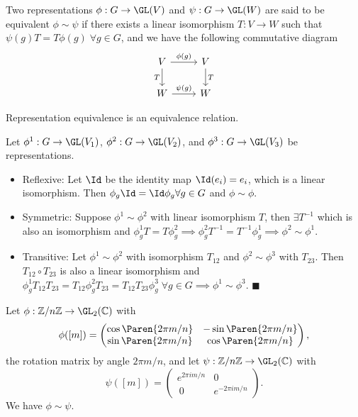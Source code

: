 \documentclass[../Project.tex]{subfiles}
\begin{document}
\begin{defi}
	Two representations $\phi : G \to \GL(V)$ and $\psi : G \to \GL(W)$ are said to be equivalent $\phi \sim \psi$ if there exists a linear isomorphism $T : V \to W$ such that $\psi(g)T =T\phi(g)\;\forall g \in G$, and we have the following commutative diagram
	$$
	\begin{tikzcd}
		V \arrow{r}{\phi(g)} \arrow[swap]{d}{T} & V \arrow{d}{T} \\%
		W \arrow{r}{\psi(g)}&W 
	\end{tikzcd}
	$$
\end{defi}

\begin{prop}[\cite{2}]
	Representation equivalence is an equivalence relation.
\end{prop}

\begin{proo*}
		Let $\phi^1 : G \to \GL(V_1)$, $\phi^2 : G \to \GL(V_2)$, and $\phi^3 : G \to \GL(V_3)$ be representations.
	\begin{itemize}
		\item Reflexive: Let $\Id$ be the identity map $\Id(e_i) = e_i$, which is a linear isomorphism. Then $\phi_g \Id = \Id\phi_g \forall g \in G$ and $\phi \sim \phi$.
		\item Symmetric: Suppose $\phi^1 \sim \phi^2$ with linear isomorphism $T$, then $\exists T^{-1}$ which is also an isomorphism and $\phi^1_g T = T\phi^2_g \implies \phi^2_gT^{-1} = T^{-1}\phi^1_g \implies \phi^2 \sim \phi^1$.
		\item Transitive: Let $\phi^1 \sim \phi^2$ with isomorphism $T_{12}$ and $\phi^2 \sim \phi^3$ with $T_{23}$. Then $T_{12} \circ T_{23}$ is also a linear isomorphism and $\phi^1_gT_{12}T_{23} = T_{12}\phi^2_g T_{23} = T_{12} T_{23} \phi^3_g\; \forall g \in G\implies \phi^1 \sim \phi^3$. $\blacksquare$
	\end{itemize}
\end{proo*}

\begin{exam}[\cite{1}]
	Let $\phi : \mathbb{Z}/n\mathbb{Z} \to \GL_2(\mathbb{C})$ with
	$$\phi([m]) = \begin{pmatrix}\cos\Paren{{2 \pi m}/{n}} & -\sin\Paren{{2 \pi m}/{n}}\\ \sin\Paren{{2 \pi m}/{n}} & \cos\Paren{{2 \pi m}/{n}}\end{pmatrix},$$
	the rotation matrix by angle $2\pi m/n$, and let $\psi : \mathbb{Z}/n\mathbb{Z} \to \GL_2(\mathbb{C})$ with
	$$\psi([m]) = \begin{pmatrix}e^{2 \pi i m/n} & 0 \\\ 0 & e^{-2 \pi i m/n}\end{pmatrix}.$$
	We have $\phi \sim \psi$.
\end{exam}
\end{document}
